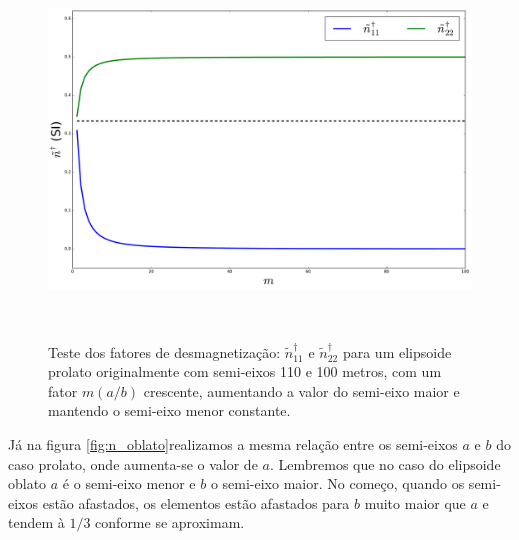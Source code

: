 \begin{figure}[hbt!]
	\centering \includegraphics[width=15cm,height=10cm]{figures/test_n_prolate}
	\caption[Teste dos fatores de desmagnetização para um elipsoide prolato.]{Teste dos fatores de desmagnetização:
		$\tilde{n}^{\dagger}_{11}$ e $\tilde{n}^{\dagger}_{22}$
		para um elipsoide prolato originalmente com semi-eixos 110 e 100 metros, com um fator $m (a/b)$ crescente,
		aumentando a valor do semi-eixo maior e mantendo o semi-eixo menor constante.}
	\label{fig:n_prolato}
\end{figure}

Já na figura \ref{fig:n_oblato}realizamos a mesma relação entre os semi-eixos $a$ e $b$ do caso prolato, onde aumenta-se o valor de $a$. Lembremos que no caso do elipsoide oblato $a$ é o semi-eixo menor e $b$ o semi-eixo maior. No começo, quando os semi-eixos estão afastados, os elementos estão afastados para $b$ muito maior que $a$ e tendem à $1/3$ conforme se aproximam.
\newpage

